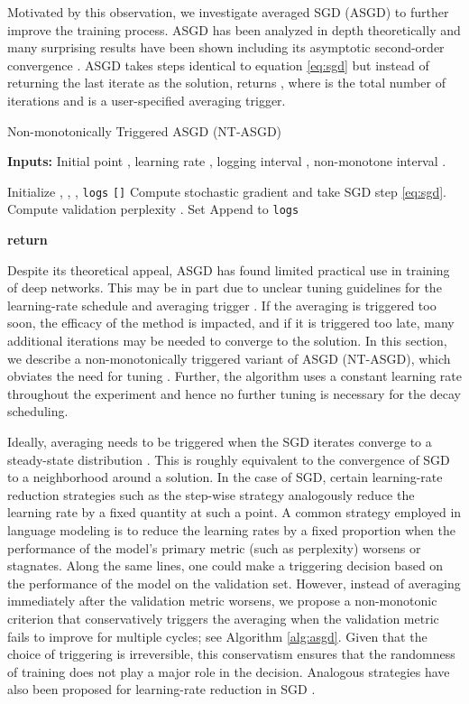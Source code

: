 \documentclass{article}
\begin{document}
Motivated by this observation, we investigate averaged SGD (ASGD) to further improve the training process. ASGD has been analyzed in depth theoretically and many surprising results have been shown including its asymptotic second-order convergence \cite{polyak1992acceleration,mandt2017stochastic}. ASGD takes steps identical to equation \eqref{eq:sgd} but instead of returning the last iterate as the solution, returns , where  is the total number of iterations and  is a user-specified averaging trigger. 

\begin{algorithm}
\caption{Non-monotonically Triggered ASGD (NT-ASGD)}
\label{alg:asgd}
{\bf Inputs:} Initial point , learning rate , logging interval , non-monotone interval .
\begin{algorithmic}[1]
\STATE Initialize , , , \texttt{logs}  \texttt{[]}
\STATE Compute stochastic gradient  and take SGD step \eqref{eq:sgd}.
\STATE Compute validation perplexity .
\STATE Set 
\ENDIF
\STATE Append  to \texttt{logs}
\STATE 
\ENDIF
\ENDWHILE
\end{algorithmic}
{\bf return }  
\end{algorithm}



Despite its theoretical appeal, ASGD has found limited practical use in training of deep networks.
This may be in part due to unclear tuning guidelines for the learning-rate schedule  and averaging trigger .
If the averaging is triggered too soon, the efficacy of the method is impacted, and if it is triggered too late, many additional iterations may be needed to converge to the solution.
In this section, we describe a non-monotonically triggered variant of ASGD (NT-ASGD), which obviates the need for tuning . Further, the algorithm uses a constant learning rate throughout the experiment and hence no further tuning is necessary for the decay scheduling.

Ideally, averaging needs to be triggered when the SGD iterates converge to a steady-state distribution \cite{mandt2017stochastic}. This is roughly equivalent to the convergence of SGD to a neighborhood around a solution. In the case of SGD, certain learning-rate reduction strategies such as the step-wise strategy analogously reduce the learning rate by a fixed quantity at such a point. A common strategy employed in language modeling is to reduce the learning rates by a fixed proportion when the performance of the model's primary metric (such as perplexity) worsens or stagnates. Along the same lines, one could make a triggering decision based on the performance of the model on the validation set. However, instead of averaging immediately after the validation metric worsens, we propose a non-monotonic criterion that conservatively triggers the averaging when the validation metric fails to improve for multiple cycles; see Algorithm \ref{alg:asgd}. Given that the choice of triggering is irreversible, this conservatism ensures that the randomness of training does not play a major role in the decision. Analogous strategies have also been proposed for learning-rate reduction in SGD \cite{keskar2015nonmonotone}.
\end{document}
